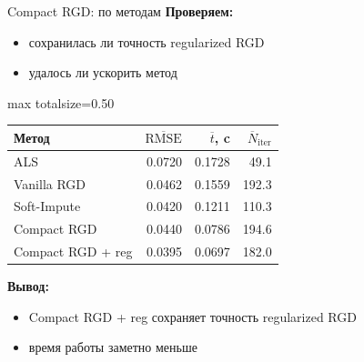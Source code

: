 \documentclass[aspectratio=169,xcolor=dvipsnames]{beamer}
\begin{document}
\begin{frame}{Compact RGD: по методам}
\scriptsize
\textbf{Проверяем:}
\begin{itemize}
\item сохранилась ли точность regularized RGD
\item удалось ли ускорить метод
\end{itemize}

\begin{center}
\begin{adjustbox}{max totalsize={\textwidth}{0.50\textheight}}
\begin{tabular}{lrrr}
\toprule
Метод & $\overline{\mathrm{RMSE}}$ & $\overline{t}$, c & $\overline{N}_{\mathrm{iter}}$ \\
\midrule
ALS & 0.0720 & 0.1728 & 49.1 \\
Vanilla RGD & 0.0462 & 0.1559 & 192.3 \\
Soft-Impute & 0.0420 & 0.1211 & 110.3 \\
Compact RGD & 0.0440 & 0.0786 & 194.6 \\
\textcolor{green!50!black}{Compact RGD + reg} & \textcolor{green!50!black}{0.0395} & \textcolor{green!50!black}{0.0697} & \textcolor{green!50!black}{182.0} \\
\bottomrule
\end{tabular}
\end{adjustbox}
\end{center}

\textbf{Вывод:}
\begin{itemize}
\item Compact RGD + reg сохраняет точность regularized RGD
\item время работы заметно меньше
\end{itemize}
\end{frame}
\end{document}
